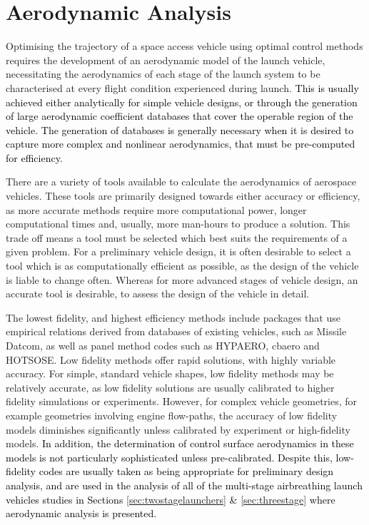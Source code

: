  







\section{Aerodynamic Analysis}

Optimising the trajectory of a space access vehicle using optimal control methods requires the development of an aerodynamic model of the launch vehicle, necessitating the aerodynamics of each stage of the launch system to be characterised at every flight condition experienced during launch. \textcolor{black}{This is usually achieved either analytically for simple vehicle designs, or through the generation of large aerodynamic coefficient databases that cover the operable region of the vehicle. The generation of databases is generally necessary when it is desired to capture more complex and nonlinear aerodynamics, that must be pre-computed for efficiency.}

There are a variety of tools available to calculate the aerodynamics of aerospace vehicles.
 These tools are primarily designed towards either accuracy or efficiency, as more accurate methods require more computational power, longer computational times and, usually, more man-hours to produce a solution. 
This trade off means a tool must be selected which best suits the requirements of a given problem. 
For a preliminary vehicle design, it is often desirable to select a tool which is as computationally efficient as possible, as the design of the vehicle is liable to change often. 
Whereas for more advanced stages of vehicle design, an accurate tool is desirable, to assess the design of the vehicle in detail. 

The lowest fidelity, and highest efficiency methods include packages that use empirical relations derived from databases of existing vehicles, such as Missile Datcom\cite{Rosema2011}, as well as panel method codes such as HYPAERO\cite{Preller2017b}, cbaero\cite{Kinney2004} and HOTSOSE\cite{hotsose}. Low fidelity methods offer rapid solutions, with highly variable accuracy. For simple, standard vehicle shapes, low fidelity methods may be relatively accurate, as low fidelity solutions are usually calibrated to higher fidelity simulations or experiments. However, for complex vehicle geometries, for example geometries involving engine flow-paths, the accuracy of low fidelity models diminishes significantly\cite{Krause2011} unless calibrated by experiment or high-fidelity models. \textcolor{black}{In addition, the determination of control surface aerodynamics in these models is not particularly sophisticated unless pre-calibrated. Despite this, low-fidelity codes are usually taken as being appropriate for preliminary design analysis, and are used in the analysis of all of the multi-stage airbreathing launch vehicles studies in Sections \ref{sec:twostagelaunchers} \& \ref{sec:threestage} where aerodynamic analysis is presented\cite{Wilhite1991,Fujikawa2017,Mehta2001,Takahashi1997,Germain2001,Eklund2012,Bradford2002,Kimura1999,Preller2018a}.} 

